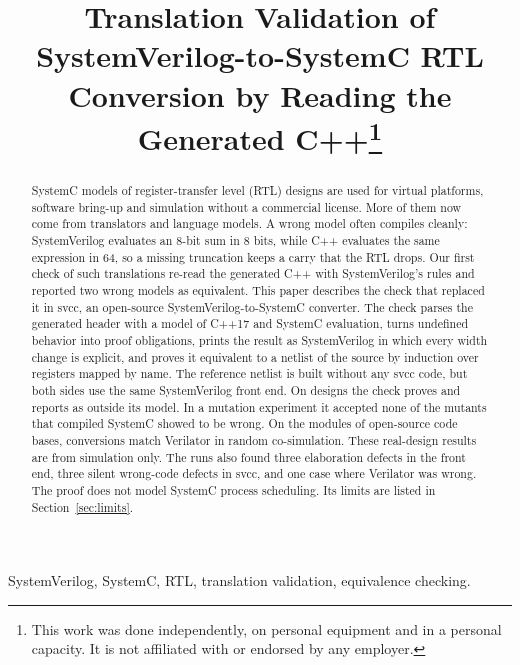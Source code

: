 \documentclass[conference]{IEEEtran}
\newcommand{\code}[1]{{\fontshape{n}\ttfamily #1}}
\begin{document}
\title{Translation Validation of SystemVerilog-to-SystemC RTL Conversion by Reading the Generated C++\thanks{This work was done independently, on personal equipment and in a personal capacity. It is not affiliated with or endorsed by any employer.}}

\author{
}

\maketitle
\thispagestyle{plain}

\begin{abstract}
SystemC models of register-transfer level (RTL) designs are used for virtual platforms, software
bring-up and simulation without a commercial license. More of them now come from translators
and language models. A wrong model often compiles cleanly: SystemVerilog evaluates an 8-bit sum
in 8 bits, while C++ evaluates the same expression in 64, so a missing truncation keeps a carry
that the RTL drops. Our first check of such translations re-read the generated C++ with
SystemVerilog's rules and reported two wrong models as equivalent. This paper describes the
check that replaced it in \code{svcc}, an open-source SystemVerilog-to-SystemC converter. The
check parses the generated header with a model of C++17 and SystemC evaluation, turns undefined
behavior into proof obligations, prints the result as SystemVerilog in which every width change
is explicit, and proves it equivalent to a netlist of the source by induction over registers
mapped by name. The reference netlist is built without any \code{svcc} code, but both sides use
the same SystemVerilog front end. On \nDesigns{} designs the check proves \nProved{} and reports
\nNotCovered{} as outside its model. In a mutation experiment it accepted none of the
\nMutSimDiffers{} mutants that compiled SystemC showed to be wrong. On the \nModules{} modules of
\nCodeBases{} open-source code bases, \nMatch{} conversions match Verilator in random
co-simulation. These real-design results are from simulation only. The runs also found three
elaboration defects in the front end, three silent wrong-code defects in \code{svcc}, and one
case where Verilator was wrong. The proof does not model SystemC process scheduling. Its limits
are listed in Section~\ref{sec:limits}.
\end{abstract}

\begin{IEEEkeywords}
SystemVerilog, SystemC, RTL, translation validation, equivalence checking.
\end{IEEEkeywords}
\end{document}
